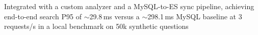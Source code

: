 \item Integrated  with a custom analyzer and a MySQL-to-ES sync pipeline, achieving end-to-end search P95 of $\sim$29.8\,ms versus a $\sim$298.1\,ms MySQL baseline at 3 requests/s in a local benchmark on 50k synthetic questions
